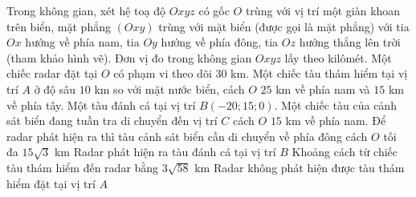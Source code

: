 \begin{ex}%
Trong không gian, xét hệ toạ độ $Oxyz$ có gốc $O$ trùng với vị trí một giàn khoan trên biển, mặt phẳng $(Oxy)$ trùng với mặt biển (được gọi là mặt phẳng) với tia $Ox$ hướng về phía nam, tia $Oy$ hướng về phía đông, tia $Oz$ hướng thẳng lên trời (tham khảo hình vẽ). Đơn vị đo trong không gian $Oxyz$ lấy theo kilômét. Một chiếc radar đặt tại $O$ có phạm vi theo dõi $30$ km. Một chiếc tàu thám hiểm tại vị trí $A$ ở độ sâu $10$ km so với mặt nước biển, cách $O$ $25$ km về phía nam và $15$ km về phía tây. Một tàu đánh cá tại vị trí $B(-20;15;0)$.
\choiceTF
{\True Một chiếc tàu của cảnh sát biển đang tuần tra di chuyển đến vị trí $C$ cách $O$ $15$ km về phía nam. Để radar phát hiện ra thì tàu cảnh sát biển cần di chuyển về phía đông cách $O$ tối đa $15\sqrt{3}$ km}
{\True Radar phát hiện ra tàu đánh cá tại vị trí $B$}
{\True Khoảng cách từ chiếc tàu thám hiểm đến radar bằng $3\sqrt{58}$ km}
{\True Radar không phát hiện được tàu thám hiểm đặt tại vị trí $A$}
\end{ex}
